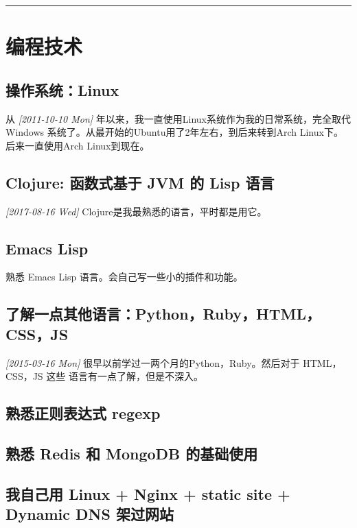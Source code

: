 \documentclass[11pt]{article}
\begin{document}
\noindent\rule{\textwidth}{0.8pt}

\section{编程技术}
\label{sec:org3692fd6}

\subsection{操作系统：Linux}
\label{sec:org135f1d5}

从 \textit{[2011-10-10 Mon] } 年以来，我一直使用Linux系统作为我的日常系统，完全取代Windows
系统了。从最开始的Ubuntu用了2年左右，到后来转到Arch Linux下。后来一直使用Arch
Linux到现在。

\subsection{Clojure: 函数式基于 JVM 的 Lisp 语言}
\label{sec:org0cf2864}

\textit{[2017-08-16 Wed] } Clojure是我最熟悉的语言，平时都是用它。

\subsection{Emacs Lisp}
\label{sec:org36e95bc}

熟悉 Emacs Lisp 语言。会自己写一些小的插件和功能。

\subsection{了解一点其他语言：Python，Ruby，HTML，CSS，JS}
\label{sec:orgea8bc47}

\textit{[2015-03-16 Mon] } 很早以前学过一两个月的Python，Ruby。然后对于 HTML，CSS，JS 这些
语言有一点了解，但是不深入。

\subsection{熟悉正则表达式 regexp}
\label{sec:org37f5bb8}

\subsection{熟悉 Redis 和 MongoDB 的基础使用}
\label{sec:orga4ceb06}

\subsection{我自己用 Linux + Nginx + static site + Dynamic DNS 架过网站}
\label{sec:orge1d16b1}
\end{document}
